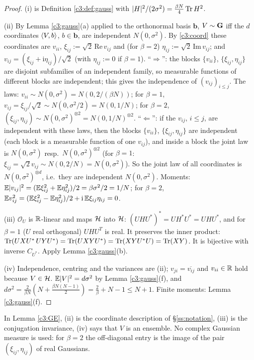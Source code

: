 \begin{proof}
(i) is Definition \ref{c3:def:gauss} with $|H|^2/(2\sigma^2)=\frac{\beta N}4\operatorname{Tr} H^2$.

(ii) By Lemma \ref{c3:gauss}(a) applied to the orthonormal basis $\mathbf b$, $V\sim\mathbf{G}$ iff the $d$ coordinates $\langle V,b\rangle$, $b\in\mathbf b$, are independent $N(0,\sigma^2)$. By \eqref{c3:coord} these coordinates are $v_{ii}$, $\xi_{ij}:=\sqrt2\,\mathrm{Re}\,v_{ij}$ and (for $\beta=2$) $\eta_{ij}:=\sqrt2\,\mathrm{Im}\,v_{ij}$; and $v_{ij}=(\xi_{ij}+\mathrm i\eta_{ij})/\sqrt2$ (with $\eta_{ij}:=0$ if $\beta=1$).
``$\Rightarrow$'': the blocks $\{v_{ii}\}$, $\{\xi_{ij},\eta_{ij}\}$ are disjoint subfamilies of an independent family, so measurable functions of different blocks are independent; this gives the independence of $(v_{ij})_{i\le j}$. The laws: $v_{ii}\sim N(0,\sigma^2)=N(0,2/(\beta N))$; for $\beta=1$, $v_{ij}=\xi_{ij}/\sqrt2\sim N(0,\sigma^2/2)=N(0,1/N)$; for $\beta=2$, $(\xi_{ij},\eta_{ij})\sim N(0,\sigma^2)^{\otimes2}=N(0,1/N)^{\otimes2}$.
``$\Leftarrow$'': if the $v_{ij}$, $i\le j$, are independent with these laws, then the blocks $\{v_{ii}\}$, $\{\xi_{ij},\eta_{ij}\}$ are independent (each block is a measurable function of one $v_{ij}$), and inside a block the joint law is $N(0,\sigma^2)$ resp.\ $N(0,\sigma^2)^{\otimes2}$ (for $\beta=1$: $\xi_{ij}=\sqrt2v_{ij}\sim N(0,2/N)=N(0,\sigma^2)$). So the joint law of all coordinates is $N(0,\sigma^2)^{\otimes d}$, i.e.\ they are independent $N(0,\sigma^2)$.
Moments: $\mathbb{E}|v_{ij}|^2=(\mathbb{E}\xi_{ij}^2+\mathbb{E}\eta_{ij}^2)/2=\beta\sigma^2/2=1/N$; for $\beta=2$, $\mathbb{E} v_{ij}^2=(\mathbb{E}\xi_{ij}^2-\mathbb{E}\eta_{ij}^2)/2+\mathrm i\,\mathbb{E}\xi_{ij}\eta_{ij}=0$.

(iii) $\mathcal O_U$ is $\mathbb{R}$-linear and maps $\mathcal{H}$ into $\mathcal{H}$: $(UHU^*)^*=UH^*U^*=UHU^*$, and for $\beta=1$ ($U$ real orthogonal) $UHU^{T}$ is real. It preserves the inner product: $\operatorname{Tr}(UXU^*\,UYU^*)=\operatorname{Tr}(UXYU^*)=\operatorname{Tr}(XYU^*U)=\operatorname{Tr}(XY)$. It is bijective with inverse $C_{U^*}$. Apply Lemma \ref{c3:gauss}(b).

(iv) Independence, centring and the variances are (ii); $v_{ji}=\overline{v_{ij}}$ and $v_{ii}\in\mathbb{R}$ hold because $V\in\mathcal{H}$.
$\mathbb{E}|V|^2=d\sigma^2$ by Lemma \ref{c3:gauss}(f), and $d\sigma^2=\frac{2}{\beta N}(N+\frac{\beta N(N-1)}2)=\frac2\beta+N-1\le N+1$. Finite moments: Lemma \ref{c3:gauss}(f).
\end{proof}

\begin{auxremark}\label{c3:rem:I1}
In Lemma \ref{c3:GE}, (ii) is the coordinate description of \S\ref{ss:notation}, (iii) is the conjugation invariance, (iv) says that $V$ is an ensemble. No complex Gaussian measure is used: for $\beta=2$ the off-diagonal entry is the image of the pair $(\xi_{ij},\eta_{ij})$ of real Gaussians.
\end{auxremark}


